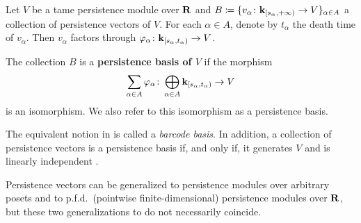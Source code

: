 \begin{definition}
  Let $V$ be a tame persistence module over $\mathbf{R}$ and $B \coloneq \{v_\alpha \colon \mathbf{k}_{[s_\alpha, +\infty)} \to V\}_{\alpha \in A}$ a collection of persistence vectors of $V$. For each $\alpha \in A$, denote by $t_\alpha$ the death time of $v_\alpha$. Then $v_\alpha$ factors through $\varphi_\alpha \colon \mathbf{k}_{[s_\alpha, t_\alpha)} \to V$.
  
  The collection $B$ is a \textbf{persistence basis of $V$} if the morphism
  \[
    \sum_{\alpha \in A} \varphi_\alpha \colon \bigoplus_{\alpha \in A} \mathbf{k}_{[s_\alpha, t_\alpha)} \to V
  \]
  is an isomorphism. We also refer to this isomorphism as a persistence basis.
\end{definition}
  
\begin{remark}
  The equivalent notion in \cite{TorrasCasas2023} is called a \textit{barcode basis}. In addition, a collection of persistence vectors is a persistence basis if, and only if, it generates $V$ and is linearly independent \cite[Proposition 3.11]{TorrasCasas2023}.
\end{remark}

Persistence vectors can be generalized to persistence modules over arbitrary posets and to p.f.d.\ (pointwise finite-dimensional) persistence modules over $\mathbf{R}$, but these two generalizations to do not necessarily coincide.

